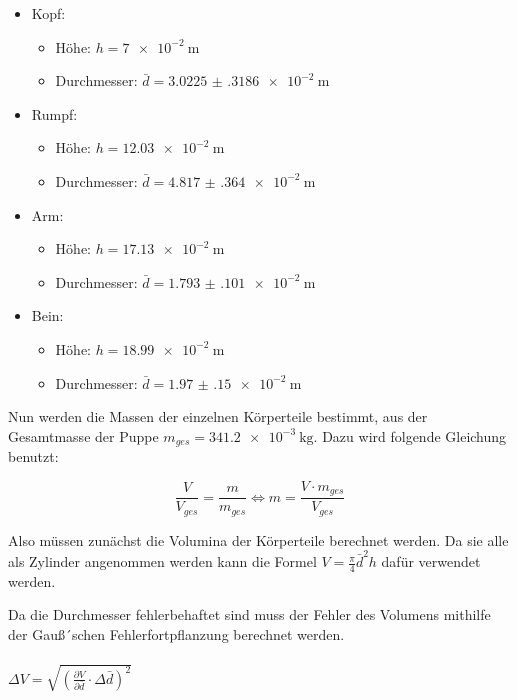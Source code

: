 \begin{itemize}
  \item Kopf:
    \begin{itemize}
      \item Höhe: $h = \SI{7e-2}{\meter}$
      \item Durchmesser: $\bar{d} = \SI{3.0225(3186)e-2}{\meter}$
    \end{itemize}
  \item Rumpf:
    \begin{itemize}
      \item Höhe: $h = \SI{12.03e-2}{\meter}$
      \item Durchmesser: $\bar{d} = \SI{4.817(364)e-2}{\meter}$
    \end{itemize}
  \item Arm:
    \begin{itemize}
      \item Höhe: $h = \SI{17.13e-2}{\meter}$
      \item Durchmesser: $\bar{d} = \SI{1.793(101)e-2}{\meter}$
    \end{itemize}
  \item Bein:
    \begin{itemize}
      \item Höhe: $h = \SI{18.99e-2}{\meter}$
      \item Durchmesser: $\bar{d} = \SI{1.97(15)e-2}{\meter}$
    \end{itemize}
\end{itemize}

Nun werden die Massen der einzelnen Körperteile bestimmt, aus der Gesamtmasse der
Puppe $m_{ges} = \SI{341.2e-3}{\kilo\gram}$. Dazu wird folgende Gleichung benutzt:

\begin{equation}
  \frac{V}{V_{ges}} = \frac{m}{m_{ges}} \iff m = \frac{V \cdot m_{ges}}{V_{ges}}
\end{equation}

Also müssen zunächst die Volumina der Körperteile berechnet werden. Da sie alle als
Zylinder angenommen werden kann die Formel $V = \frac{\pi}{4} \bar{d}^2 h$ dafür verwendet
werden.

Da die Durchmesser fehlerbehaftet sind muss der Fehler des Volumens mithilfe der
Gauß´schen Fehlerfortpflanzung berechnet werden.\\\\

$\Delta V = \sqrt{\left(\frac{\partial V}{\partial \bar{d}} \cdot \Delta \bar{d} \right)^2}$\\\\

